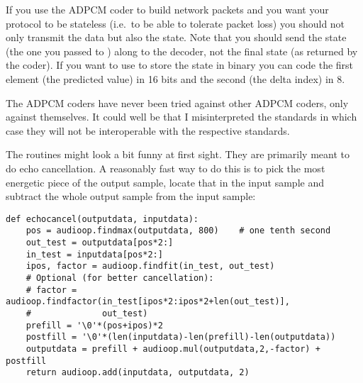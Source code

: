 If you use the ADPCM coder to build network packets and you want your
protocol to be stateless (i.e.\ to be able to tolerate packet loss)
you should not only transmit the data but also the state.  Note that
you should send the  state (the one you passed to
) along to the decoder, not the final state (as returned by
the coder).  If you want to use  to store the state in
binary you can code the first element (the predicted value) in 16 bits
and the second (the delta index) in 8.

The ADPCM coders have never been tried against other ADPCM coders,
only against themselves.  It could well be that I misinterpreted the
standards in which case they will not be interoperable with the
respective standards.

The  routines might look a bit funny at first sight.
They are primarily meant to do echo cancellation.  A reasonably
fast way to do this is to pick the most energetic piece of the output
sample, locate that in the input sample and subtract the whole output
sample from the input sample:
\bcode\begin{verbatim}
def echocancel(outputdata, inputdata):
    pos = audioop.findmax(outputdata, 800)    # one tenth second
    out_test = outputdata[pos*2:]
    in_test = inputdata[pos*2:]
    ipos, factor = audioop.findfit(in_test, out_test)
    # Optional (for better cancellation):
    # factor = audioop.findfactor(in_test[ipos*2:ipos*2+len(out_test)], 
    #              out_test)
    prefill = '\0'*(pos+ipos)*2
    postfill = '\0'*(len(inputdata)-len(prefill)-len(outputdata))
    outputdata = prefill + audioop.mul(outputdata,2,-factor) + postfill
    return audioop.add(inputdata, outputdata, 2)
\end{verbatim}\ecode
